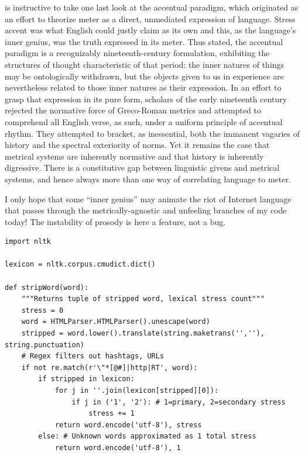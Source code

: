 \documentclass[a0,final]{a0poster}
\begin{document}
\begin{multicols}{3}
\begin{displayquote} 
[It] is instructive to take one last look at the accentual paradigm, which originated as an effort to theorize meter as a direct, unmediated expression of language. Stress accent was what English could justly claim as its own and this, as the language’s inner genius, was the truth expressed in its meter. Thus stated, the accentual paradigm is a recognizably nineteenth-century formulation, exhibiting the structures of thought characteristic of that period: the inner natures of things may be ontologically withdrawn, but the objects given to us in experience are nevertheless related to those inner natures as their expression. In an effort to grasp that expression in its pure form, scholars of the early nineteenth century rejected the normative force of Greco-Roman metrics and attempted to comprehend all English verse, as such, under a uniform principle of accentual rhythm. They attempted to bracket, as inessential, both the immanent vagaries of history and the spectral exteriority of norms. Yet it remains the case that metrical systems are inherently normative and that history is inherently digressive. There is a constitutive gap between linguistic givens and metrical systems, and hence always more than one way of correlating language to meter.\cite[481]{10.5406/jenglgermphil.114.4.0459}
\end{displayquote}

I only hope that some ``inner genius'' may animate the riot of Internet language that passes through the metrically-agnostic and unfeeling branches of my code today! The instability of prosody is here a feature, not a bug.

\begin{verbatim}
import nltk

lexicon = nltk.corpus.cmudict.dict()

def stripWord(word):
    """Returns tuple of stripped word, lexical stress count"""
    stress = 0
    word = HTMLParser.HTMLParser().unescape(word)
    stripped = word.lower().translate(string.maketrans('',''), string.punctuation)
    # Regex filters out hashtags, URLs
    if not re.match(r'\"*[@#]|http|RT', word):
        if stripped in lexicon:
            for j in ''.join(lexicon[stripped][0]):
                if j in ('1', '2'): # 1=primary, 2=secondary stress
                    stress += 1
            return word.encode('utf-8'), stress
        else: # Unknown words approximated as 1 total stress
            return word.encode('utf-8'), 1
\end{verbatim}


\end{multicols}
\end{document}
